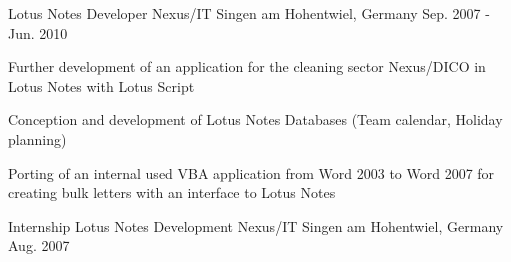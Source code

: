\begin{cventries}
  \cventry
    {Lotus Notes Developer} %
    {Nexus/IT} %
    {Singen am Hohentwiel, Germany} %
    {Sep. 2007 - Jun. 2010} %
    {
      \begin{cvitems} %
        \item {Further development of an application for the cleaning sector Nexus/DICO in Lotus Notes with Lotus Script}
        \item {Conception and development of Lotus Notes Databases (Team calendar, Holiday planning)}
        \item {Porting of an internal used VBA application from Word 2003 to Word 2007 for creating bulk letters with an interface to Lotus Notes}
      \end{cvitems}
    }

  \cventry
    {Internship Lotus Notes Development} %
    {Nexus/IT} %
    {Singen am Hohentwiel, Germany} %
    {Aug. 2007} %
    {}

\end{cventries}
